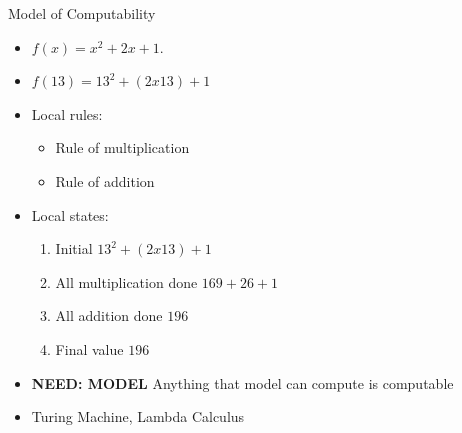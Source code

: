 \documentclass[usenames,dvipsnames]{beamer}
\begin{document}
\begin{frame}{Model of Computability}
    \begin{itemize}
        \item<1-> $f(x) = x^2 + 2x +1$. 
        \item<2-> $f(13) = 13^2 + (2x13) + 1$
        \item<3-> Local rules:
                \begin{itemize}
                    \item<4-> Rule of multiplication
                    \item<5-> Rule of addition
                \end{itemize} 
        \item<6-> Local states:
                \begin{enumerate}
                    \item<7-> Initial $13^2 + (2x13) + 1$
                    \item<8-> All multiplication done $169 + 26 + 1$
                    \item<9-> All addition done $196$
                    \item<10-> Final value $196$
                \end{enumerate}
        \item<11-> \textbf{NEED: MODEL} Anything that model can compute is computable
        \item<12-> Turing Machine, Lambda Calculus 
    \end{itemize}
\end{frame}
\end{document}
